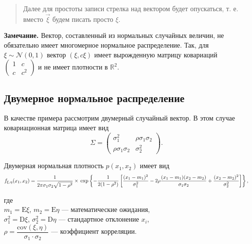 \documentclass[11pt,a4paper]{article}
\begin{document}
\begin{quote}
Далее для простоты записи стрелка над вектором будет опускаться, т. е.
вместо \(\vec{\xi}\) будем писать просто \(\xi\).
\end{quote}

    \textbf{Замечание.} Вектор, составленный из нормальных случайных
величин, не обязательно имеет многомерное нормальное распределение. Так,
для \(\xi \sim \mathcal{N}(0,1)\) вектор \((\xi, c\xi)\) имеет
вырожденную матрицу ковариаций
\(\begin{pmatrix}  1 & c \\  c & c^2 \end{pmatrix}\) и не имеет
плотности в \(\mathbb{R}^2\).

    \hypertarget{ux434ux432ux443ux43cux435ux440ux43dux43eux435-ux43dux43eux440ux43cux430ux43bux44cux43dux43eux435-ux440ux430ux441ux43fux440ux435ux434ux435ux43bux435ux43dux438ux435}{%
\subsection{Двумерное нормальное
распределение}\label{ux434ux432ux443ux43cux435ux440ux43dux43eux435-ux43dux43eux440ux43cux430ux43bux44cux43dux43eux435-ux440ux430ux441ux43fux440ux435ux434ux435ux43bux435ux43dux438ux435}}

В качестве примера рассмотрим двумерный случайный вектор. В этом случае
ковариационная матрица имеет вид \[
\Sigma = 
\begin{pmatrix}
    \sigma_1^2 & \rho \sigma_1 \sigma_2 \\
    \rho \sigma_1 \sigma_2 & \sigma_2^2 
\end{pmatrix}.
\]

    Двумерная нормальная плотность \(p(x_1, x_2)\) имеет вид \[
  f_{\xi,\eta}(x_1, x_2) = \frac{1}{2\pi\sigma_1\sigma_2\sqrt{1-\rho^2}} \times \\
  \exp \left\{-\frac{1}{2(1-\rho^2)} \left[ \frac{(x_1-m_1)^2}{\sigma_1^2} - 2\rho\frac{(x_1-m_1)(x_2-m_2)}{\sigma_1\sigma_2} + \frac{(x_2-m_2)^2}{\sigma_2^2} \right]\right\},
\]

где\\
\(m_1 = \mathrm{E} \xi\), \(m_2 = \mathrm{E} \eta\) --- математические
ожидания,\\
\(\sigma_1^2 = \mathrm{D} \xi\), \(\sigma_2^2 = \mathrm{D} \eta\) ---
стандартное отклонение \(x_i\),\\
\(\rho = \dfrac{\mathrm{cov}(\xi, \eta)}{\sigma_1 \cdot \sigma_2}\) ---
коэффициент корреляции.
\end{document}
